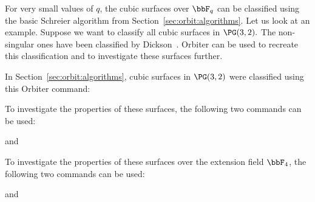 


For very small values of $q$, the cubic surfaces over $\bbF_q$ can be classified using the 
basic Schreier algorithm from Section~\ref{sec:orbit:algorithms}.
Let us look at an example. 
Suppose we want to classify all cubic surfaces in $\PG(3,2).$ 
The non-singular ones have been classified by 
Dickson~\cite{Dickson15}.
Orbiter can be used to recreate this classification and to investigate these surfaces further.

\bigskip


In Section~\ref{sec:orbit:algorithms},  cubic surfaces in $\PG(3,2)$ 
were classified using this Orbiter command:
{\tt

}
To investigate the properties of these surfaces, 
the following two commands can be used:
{\tt

}
and
{\tt

}
To investigate the properties of these surfaces over the extension field $\bbF_4$, 
the following two commands can be used:
{\tt

}
and
{\tt

}
